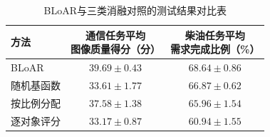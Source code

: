 \begin{table}[H]
 \centering
 \caption{BLoAR与三类消融对照的测试结果对比表}
 \label{tab:formal-ch2-ablation}
 \begin{tabular}{lcc}
  \toprule
  方法 & \shortstack{通信任务平均\\图像质量得分（分）} & \shortstack{柴油任务平均\\需求完成比例（\%）} \\
  \midrule
   BLoAR & \(39.69\pm0.43\) & \(68.64\pm0.86\) \\
   随机基函数 & \(33.61\pm1.77\) & \(66.87\pm0.62\) \\
   按比例分配 & \(37.58\pm1.38\) & \(65.96\pm1.54\) \\
   逐对象评分 & \(33.17\pm0.87\) & \(60.94\pm1.55\) \\
  \bottomrule
 \end{tabular}
\end{table}

